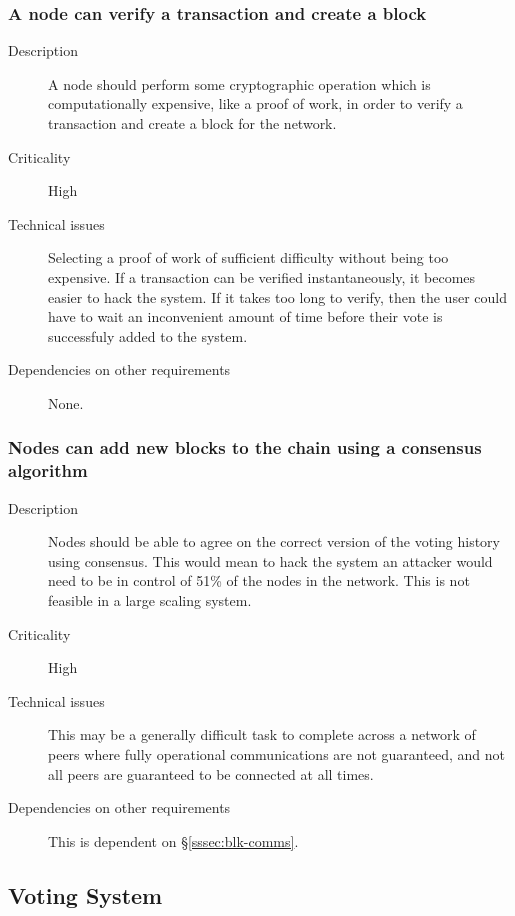 \documentclass[a4paper,12pt]{article}
\begin{document}
\subsubsection{A node can verify a transaction and create a block}
\begin{description}
	\item[Description]
		A node should perform some cryptographic operation which is computationally expensive, like a proof of work, in order to verify a transaction and create a block for the network.
	\item[Criticality]
		High
	\item[Technical issues]
		Selecting a proof of work of sufficient difficulty without being too expensive. If a transaction can be verified instantaneously, it becomes easier to hack the system. If it takes too long to verify, then the user could have to wait an inconvenient amount of time before their vote is successfuly added to the system.
	\item[Dependencies on other requirements]
		None.
\end{description}

\subsubsection{Nodes can add new blocks to the chain using a consensus algorithm}
\begin{description}
	\item[Description]
		Nodes should be able to agree on the correct version of the voting history using consensus. This would mean to hack the system an attacker would need to be in control of 51\% of the nodes in the network. This is not feasible in a large scaling system.
	\item[Criticality]
		High
	\item[Technical issues]
		This may be a generally difficult task to complete across a network of peers where fully operational communications are not guaranteed, and not all peers are guaranteed to be connected at all times.
	\item[Dependencies on other requirements]
		This is dependent on \S\ref{sssec:blk-comms}.
\end{description}

\subsection{Voting System}
\end{document}
